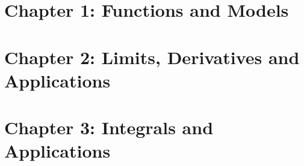 \documentclass[12pt]{article}
\begin{document}
\renewcommand{\proofname}{Proof}


\tableofcontents
\pagebreak

\setcounter{page}{1}

\section{Chapter 1: Functions and Models}




\section{Chapter 2: Limits, Derivatives and Applications}








\section{Chapter 3: Integrals and Applications}











% 

 

\appendix


\end{document}
